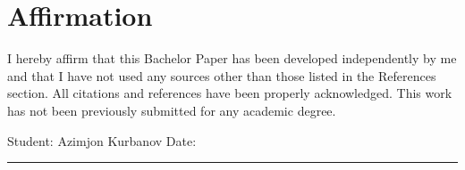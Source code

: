 \documentclass[12pt,a4paper]{report}
\begin{document}
\chapter*{Affirmation}

I hereby affirm that this Bachelor Paper has been developed independently by me and that I
have not used any sources other than those listed in the References section. All citations
and references have been properly acknowledged. This work has not been previously submitted
for any academic degree.

\vspace{1.5cm}
\noindent Student: Azimjon Kurbanov \hfill Date: \rule{4cm}{0.4pt}
\end{document}
